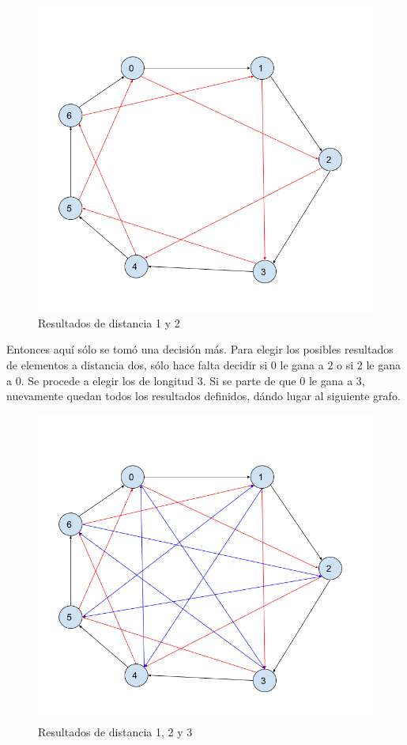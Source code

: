 \begin{figure}[H]\centering\includegraphics[scale=0.4]{Imagenes/Ej4b.png}\caption{Resultados de distancia 1 y 2}\end{figure}

Entonces aquí sólo se tomó una decisión más. Para elegir los posibles resultados de elementos a distancia dos, sólo hace falta decidir si $0$ le gana a $2$ o si $2$ le gana a $0$. Se procede a elegir los de longitud 3. Si se parte de que $0$ le gana a $3$, nuevamente quedan todos los resultados definidos, dándo lugar al siguiente grafo.

\begin{figure}[H]
\centering
\includegraphics[scale=0.4]{Imagenes/Ej4c.png}
\caption{Resultados de distancia 1, 2 y 3}
\end{figure}

